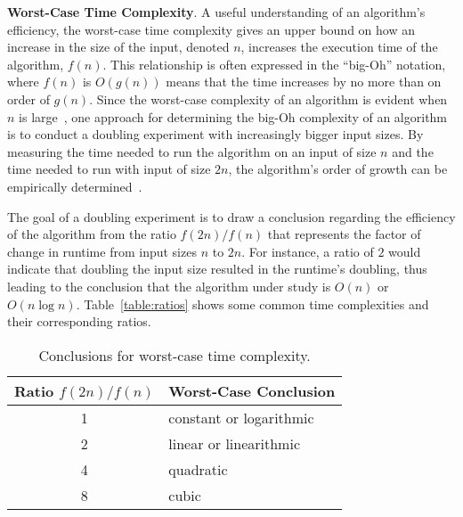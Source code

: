 {\bf Worst-Case Time Complexity}. A useful understanding of an algorithm's efficiency, the worst-case time complexity
gives an upper bound on how an increase in the size of the input, denoted $n$, increases the execution time of the
algorithm, $f(n)$.  This relationship is often expressed in the ``big-Oh'' notation, where $f(n)$ is $O(g(n))$ means
that the time increases by no more than on order of $g(n)$. Since the worst-case complexity of an algorithm is evident
when $n$ is large~\cite{goodrich2014}, one approach for determining the big-Oh complexity of an algorithm is to conduct
a doubling experiment with increasingly bigger input sizes. By measuring the time needed to run the algorithm on an
input of size $n$ and the time needed to run with input of size $2n$, the algorithm's order of growth can be
empirically determined~\cite{mcgeoch2012,sedgewick1998}.

The goal of a doubling experiment is to draw a conclusion regarding the efficiency of the algorithm from the ratio
$f(2n)/f(n)$ that represents the factor of change in runtime from input sizes $n$ to $2n$. For instance, a ratio of $2$
would indicate that doubling the input size resulted in the runtime's doubling, thus leading to the conclusion that the
algorithm under study is $O(n)$ or $O(n\log n)$.  Table~\ref{table:ratios} shows some common time complexities and their
corresponding ratios.

\begin{table}[t]

  \begin{center}

    \begin{tabular}{c|l}
      Ratio $f(2n)/f(n)$ & Worst-Case Conclusion              \\ \hline
      1                  & constant or logarithmic \\
      2                  & linear or linearithmic  \\
      4                  & quadratic               \\
      8                  & cubic                   \\
    \end{tabular}

  \end{center}
  \vspace*{-.25in}

  \caption{Conclusions for worst-case time complexity.} 
  \vspace*{-.25in}

\end{table}

